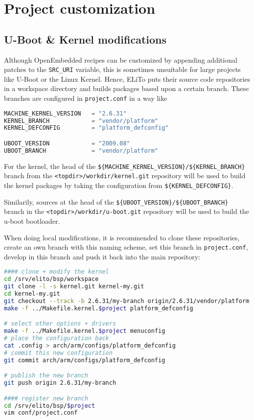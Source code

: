\chapter{Project customization}
\label{chap:project-customization}

\section{U-Boot \& Kernel modifications}
\label{sec:project-customization_u-boot+kernel-modifications}

Although OpenEmbedded recipes can be customized by appending
additional patches to the \texttt{SRC\_URI} variable, this is
sometimes unsuitable for large projects like U-Boot or the Linux
Kernel.  Hence, ELiTo puts their source code repositories in a
workspace directory and builds packages based upon a certain
branch. These branches are configured in \texttt{project.conf} in a
way like

\begin{lstlisting}[language=python]
MACHINE_KERNEL_VERSION   = "2.6.31"
KERNEL_BRANCH            = "vendor/platform"
KERNEL_DEFCONFIG         = "platform_defconfig"

UBOOT_VERSION            = "2009.08"
UBOOT_BRANCH             = "vendor/platform"
\end{lstlisting}

For the kernel, the head of the
\texttt{\$\{MACHINE\_KERNEL\_VERSION\}/\$\{KERNEL\_BRANCH\}} branch
from the \texttt{<topdir>/workdir/kernel.git} repository will be used
to build the kernel packages by taking the configuration from
\texttt{\$\{KERNEL\_DEFCONFIG\}}.

Similarily, sources at the head of the
\texttt{\$\{UBOOT\_VERSION\}/\$\{UBOOT\_BRANCH\}} branch in the
\texttt{<topdir>/workdir/u-boot.git} repository will be used to
build the u-boot bootloader.

When doing local modifications, it is recommended to clone these
repositories, create an own branch with this naming scheme, set this
branch in \texttt{project.conf}, develop in this branch and push it
back into the main repository:

\begin{lstlisting}[language=sh]
#### clone + modify the kernel
cd /srv/elito/bsp/workspace
git clone -l -s kernel.git kernel-my.git
cd kernel-my.git
git checkout --track -b 2.6.31/my-branch origin/2.6.31/vendor/platform
make -f ../Makefile.kernel.$project platform_defconfig

# select other options + drivers
make -f ../Makefile.kernel.$project menuconfig
# place the configuration back
cat .config > arch/arm/configs/platform_defconfig
# commit this new configuration
git commit arch/arm/configs/platform_defconfig

# publish the new branch
git push origin 2.6.31/my-branch

#### register new branch
cd /srv/elito/bsp/$project
vim conf/project.conf
\end{lstlisting}

